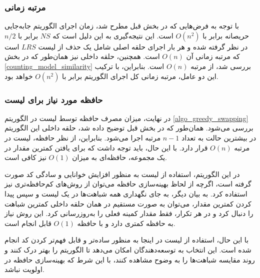 \subsubsection{مرتبه زمانی}
با توجه به فرض‌هایی که در بخش قبل مطرح شد، زمان اجرای الگوریتم جابه‌جایی حریصانه برابر با \( O(n^2) \) است. این نتیجه‌گیری به این دلیل است که \( NS \) برابر با \( n/2 \) در نظر گرفته شده و هر بار اجرای حلقه اصلی شامل یک حذف از لیست \( LRS \) است که مرتبه زمانی آن \( O(n) \) است. همچنین، حلقه داخلی نیز همان‌طور که در بخش
\ref{counting_model_similarity}
بررسی شد، از مرتبه \( O(n) \) است. بنابراین، با ترکیب این دو عامل، مرتبه زمانی کل اجرای الگوریتم برابر با \( O(n^2) \) خواهد بود.


\subsubsection{
	حافظه مورد نیاز برای لیست
}
در نهایت، میزان مصرف حافظه توسط لیست
در الگوریتم
 \ref{algo_greedy_swapping} 
بررسی می‌شود. همان‌طور که در بخش قبل توضیح داده شد، حلقه داخلی این الگوریتم در بیشترین حالت به تعداد \(n-1\) مرتبه اجرا می‌شود. بنابراین، از نظر حافظه، لیست
در مرتبه \(O(n)\) قرار دارد. با این حال، باید توجه داشت که برای یافتن کمترین مقدار در یک مجموعه، حافظه‌ای به میزان \(O(1)\) نیز کافی است. 

در این الگوریتم، استفاده از لیست
به منظور افزایش خوانایی و سادگی کد صورت گرفته است، اگرچه از لحاظ بهینه‌سازی حافظه می‌توان از روش‌های کم‌حافظه‌تری نیز استفاده کرد. به بیان دیگر، به جای نگهداری همه شباهت‌ها در یک لیست و سپس پیدا کردن کمترین مقدار، می‌توان به صورت مستقیم در همان حلقه داخلی کمترین شباهت را دنبال کرد و در هر تکرار، فقط مقدار کمینه فعلی را به‌روزرسانی کرد. این روش نیاز به حافظه کمتری دارد و با حافظه \(O(1)\) قابل انجام است.

با این حال، استفاده از لیست
در اینجا به منظور ساده‌تر و قابل فهم‌تر کردن کد انجام شده است. این انتخاب به توسعه‌دهندگان امکان می‌دهد تا الگوریتم را بهتر درک کنند و روند مقایسه شباهت‌ها را به وضوح مشاهده کنند، با این شرط که بهینه‌سازی حافظه در اولویت نباشد.




